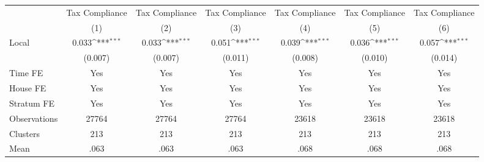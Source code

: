 {
\def\sym#1{\ifmmode^{#1}\else\(^{#1}\)\fi}
\begin{tabular}{l*{6}{c}}
\hline\hline
                &\multicolumn{1}{c}{Tax Compliance}&\multicolumn{1}{c}{Tax Compliance}&\multicolumn{1}{c}{Tax Compliance}&\multicolumn{1}{c}{Tax Compliance}&\multicolumn{1}{c}{Tax Compliance}&\multicolumn{1}{c}{Tax Compliance}\\
                &\multicolumn{1}{c}{(1)}         &\multicolumn{1}{c}{(2)}         &\multicolumn{1}{c}{(3)}         &\multicolumn{1}{c}{(4)}         &\multicolumn{1}{c}{(5)}         &\multicolumn{1}{c}{(6)}         \\
\hline
Local           &    0.033\sym{***}&    0.033\sym{***}&    0.051\sym{***}&    0.039\sym{***}&    0.036\sym{***}&    0.057\sym{***}\\
                &  (0.007)         &  (0.007)         &  (0.011)         &  (0.008)         &  (0.010)         &  (0.014)         \\
Time FE         &      Yes         &      Yes         &      Yes         &      Yes         &      Yes         &      Yes         \\
House FE        &      Yes         &      Yes         &      Yes         &      Yes         &      Yes         &      Yes         \\
Stratum FE      &      Yes         &      Yes         &      Yes         &      Yes         &      Yes         &      Yes         \\
\hline
Observations    &    27764         &    27764         &    27764         &    23618         &    23618         &    23618         \\
Clusters        &      213         &      213         &      213         &      213         &      213         &      213         \\
Mean            &     .063         &     .063         &     .063         &     .068         &     .068         &     .068         \\
\hline\hline
\end{tabular}
}
